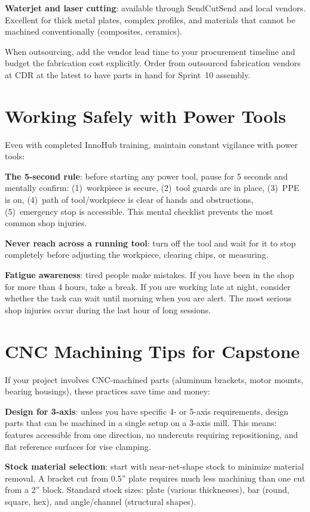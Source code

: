 \textbf{Waterjet and laser cutting}: available through SendCutSend and local vendors. Excellent for thick metal plates, complex profiles, and materials that cannot be machined conventionally (composites, ceramics).

When outsourcing, add the vendor lead time to your procurement timeline and budget the fabrication cost explicitly. Order from outsourced fabrication vendors at CDR at the latest to have parts in hand for Sprint~10 assembly.

\section{Working Safely with Power Tools}
Even with completed InnoHub training, maintain constant vigilance with power tools:

\textbf{The 5-second rule}: before starting any power tool, pause for 5 seconds and mentally confirm: (1)~workpiece is secure, (2)~tool guards are in place, (3)~PPE is on, (4)~path of tool/workpiece is clear of hands and obstructions, (5)~emergency stop is accessible. This mental checklist prevents the most common shop injuries.

\textbf{Never reach across a running tool}: turn off the tool and wait for it to stop completely before adjusting the workpiece, clearing chips, or measuring.

\textbf{Fatigue awareness}: tired people make mistakes. If you have been in the shop for more than 4 hours, take a break. If you are working late at night, consider whether the task can wait until morning when you are alert. The most serious shop injuries occur during the last hour of long sessions.



\section{CNC Machining Tips for Capstone}
If your project involves CNC-machined parts (aluminum brackets, motor mounts, bearing housings), these practices save time and money:

\textbf{Design for 3-axis}: unless you have specific 4- or 5-axis requirements, design parts that can be machined in a single setup on a 3-axis mill. This means: features accessible from one direction, no undercuts requiring repositioning, and flat reference surfaces for vise clamping.

\textbf{Stock material selection}: start with near-net-shape stock to minimize material removal. A bracket cut from 0.5'' plate requires much less machining than one cut from a 2'' block. Standard stock sizes: plate (various thicknesses), bar (round, square, hex), and angle/channel (structural shapes).

